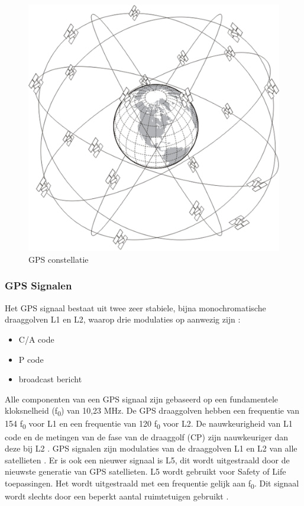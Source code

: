  \begin{figure}[hbp]
 	\includegraphics[scale=0.95]{GPS.png}
 	\centering
 	\caption{GPS constellatie \cite{LImgGPS}}
 	\label{imgGPS}
 \end{figure}

\subsubsection{ GPS Signalen}
Het GPS signaal bestaat uit twee zeer stabiele, bijna monochromatische draaggolven L1 en L2, waarop drie modulaties op aanwezig zijn \cite{LBibBeiDou4}:
\begin{itemize}
	\item C/A code
	\item P code
	\item broadcast bericht
\end{itemize}
Alle componenten van een GPS signaal zijn gebaseerd op een fundamentele kloksnelheid (f\textsubscript{0}) van 10,23 MHz. De GPS draaggolven hebben een frequentie van 154 f\textsubscript{0} voor L1 en een frequentie van 120 f\textsubscript{0} voor L2\cite{LBibGPS2}. De nauwkeurigheid van L1 code en de metingen van de fase van de draaggolf (CP) zijn nauwkeuriger dan deze bij L2 \cite{LBibBeiDou4}. GPS signalen zijn modulaties van de draaggolven L1 en L2 van alle satellieten \cite{LBibGPS3}. Er is ook een nieuwer signaal is L5, dit wordt uitgestraald door de nieuwste generatie van GPS satellieten. L5 wordt gebruikt voor Safety of Life toepassingen. Het wordt uitgestraald met een frequentie gelijk aan f\textsubscript{0}. Dit signaal wordt slechts door een beperkt aantal ruimtetuigen gebruikt \cite{LBibGNSS9}.

